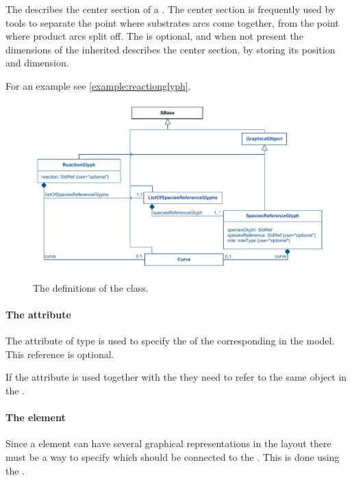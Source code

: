 The \Curve describes the center section of a \ReactionGlyph. The center 
section is frequently used by tools to separate the point where 
substrates arcs come together, from the point where product arcs split 
off. The \Curve is optional, and when not present the dimensions of the 
inherited \BoundingBox describes the center section, by storing its 
position and dimension. 


For an example see \ref{example:reactionglyph}. 


\begin{figure}[!ht]
\includegraphics[scale=0.9]{uml/layout-reactionglyph-model-uml}\\
\label{uml:reactionglyph}
\caption{The definitions of the \ReactionGlyph class.}
\end{figure}

\paragraph{The  attribute}
The  attribute of type  is used to 
specify the  of the corresponding \Reaction in the model. This 
reference is optional. 

If the  attribute is used together with the  
they need to refer to the same object in the \Model.

\paragraph {The  element}
\label{listofspeciesreferenceglyphs-class}
Since a \Species element can have several graphical representations in 
the layout there must be a way to specify which \SpeciesGlyph should be 
connected to the \ReactionGlyph. This is done using the 
. 

